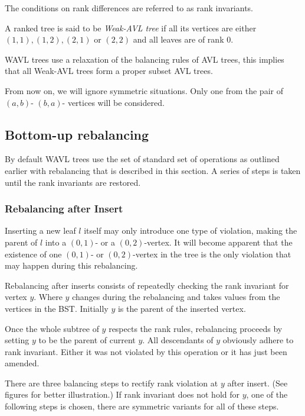 The conditions on rank differences are referred to as rank invariants.

\begin{defn}
A ranked tree is said to be {\em Weak-AVL tree} if all its vertices are either $(1,1), (1,2), (2,1)$ or $(2,2)$ and all leaves are of rank 0.
\end{defn}

WAVL trees use a relaxation of the balancing rules of AVL trees, this implies that all Weak-AVL trees form a proper subset AVL trees.

From now on, we will ignore symmetric situations. Only one from the pair of $(a,b)$- $(b,a)$- vertices will be considered.

\subsection{Bottom-up rebalancing}

By default WAVL trees use the set of standard set of operations as outlined earlier with rebalancing that is described in this section. A series of steps is taken until the rank invariants are restored.


\subsubsection*{Rebalancing after Insert}

Inserting a new leaf $l$ itself may only introduce one type of violation, making the parent of $l$ into a $(0,1)$- or a $(0,2)$-vertex. It will become apparent that the existence of one $(0,1)$- or $(0,2)$-vertex in the tree is the only violation that may happen during this rebalancing. 

Rebalancing after inserts consists of repeatedly checking the rank invariant for vertex $y$. Where $y$ changes during the rebalancing and takes values from the vertices in the BST. Initially $y$ is the parent of the inserted vertex. 

Once the whole subtree of $y$ respects the rank rules, rebalancing proceeds by setting $y$ to be the parent of current $y$. All descendants of $y$ obviously adhere to rank invariant. Either it was not violated by this operation or it has just been amended. 

There are three balancing steps to rectify rank violation at $y$ after insert. (See figures for better illustration.) If rank invariant does not hold for $y$, one of the following steps is chosen, there are symmetric variants for all of these steps. 

